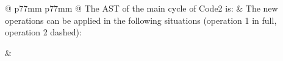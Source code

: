 \documentclass[docid=2021]{comp_exam_round1}
\begin{document}
\begin{center}
    \begin{tabular}{@{} p{77mm} p{77mm} @{}}
        The AST of the main cycle of Code2 is: & The new operations can be applied in the following situations (operation 1 in full, operation 2 dashed): \\
        \begin{minipage}{\linewidth}
            \centering
            \ttfamily\small
        \end{minipage}%
        &
        \begin{minipage}{\linewidth}
            \centering
            \ttfamily\small
            \begin{tikzpicture}
                \Tree	[.absf
                            [.-
                                x
                                [./
                                    [.+
                                        [.*
                                            [.*
                                                [.*
                                                    2
                                                    x
                                                ]

\end{tikzpicture}
\end{minipage}
\end{tabular}
\end{center}
\end{document}
